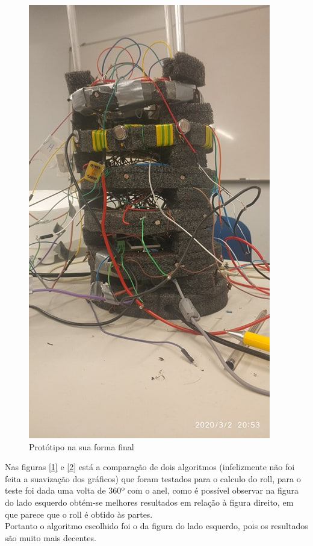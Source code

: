 \begin{figure}[!htb]
\centering
\includegraphics[scale=0.35]{Figuras/anel_final.jpg}
\caption{Protótipo na sua forma final}
\label{anel_final}
\end{figure}



\newpage
Nas figuras \ref{1} e \ref{2} está a comparação de dois algoritmos (infelizmente não foi  feita a suavização dos gráficos) que foram testados para o calculo do roll, para o teste foi dada uma volta de 360º com o anel, como é possível observar na figura do lado esquerdo obtém-se melhores resultados em relação à figura direito, em que parece que o roll é obtido às partes.
\\Portanto o algoritmo escolhido foi o da figura do lado esquerdo, pois os resultados são muito mais decentes.

